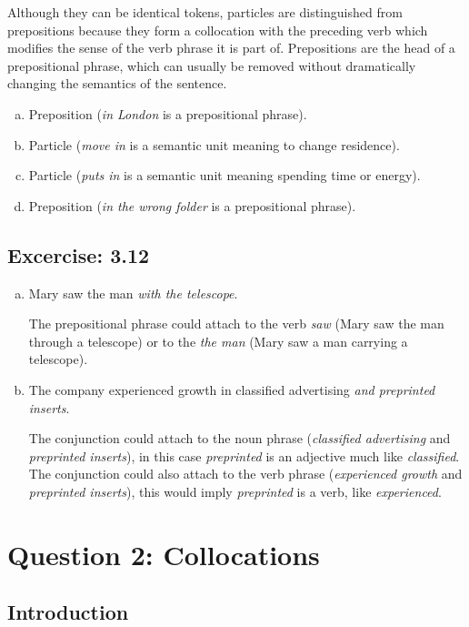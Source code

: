 Although they can be identical tokens, particles are distinguished from
prepositions because they form a collocation with the preceding verb
which modifies the sense of the verb phrase it is part of. Prepositions
are the head of a prepositional phrase, which can usually be removed
without dramatically changing the semantics of the sentence.

\begin{enumerate}[a.]
	\item Preposition (\emph{in London} is a prepositional phrase).
	\item Particle (\emph{move in} is a semantic unit meaning to change residence).
	\item Particle (\emph{puts in} is a semantic unit meaning spending time or energy).
	\item Preposition (\emph{in the wrong folder} is a prepositional phrase).
\end{enumerate}

\subsection*{Excercise: 3.12}

\begin{enumerate}[a.]
	\item Mary saw the man \emph{with the telescope}.

The prepositional phrase could attach to the verb \emph{saw} (Mary saw the man
through a telescope) or to the \emph{the man} (Mary saw a man carrying a
telescope).

	\item The company experienced growth in classified advertising
			\emph{and preprinted inserts}.

The conjunction could attach to the noun phrase (\emph{classified advertising}
and \emph{preprinted inserts}), in this case \emph{preprinted} is an adjective
much like \emph{classified}. The conjunction could also attach to the verb
phrase (\emph{experienced growth} and \emph{preprinted inserts}), this would
imply \emph{preprinted} is a verb, like \emph{experienced}.
\end{enumerate}

\pagebreak

\section*{Question 2: Collocations}

\subsection*{Introduction}

